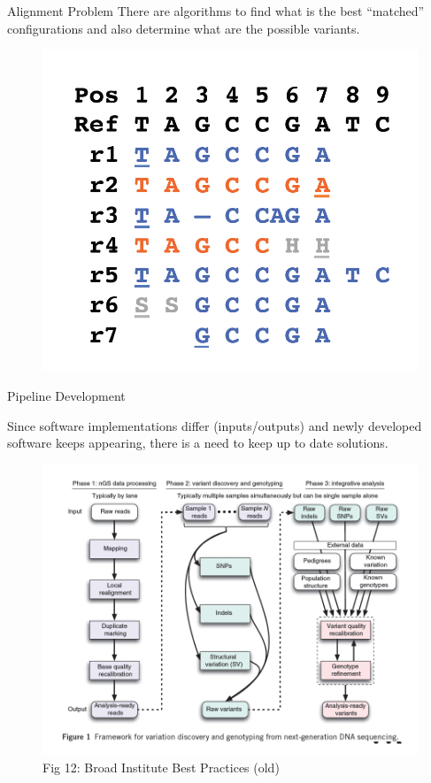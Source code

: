 \documentclass{beamer}
\begin{document}
	
	\begin{frame}{Alignment Problem}
		There are algorithms to find what is the best “matched” configurations and
		also determine what are the possible variants.
		
		\begin{figure}[h]
			\centering
			\includegraphics[scale=0.45]{Figures/alignment_problem.png}
		\end{figure}	
		
	\end{frame}
	
	
	\begin{frame}{Pipeline Development}
		
		Since software implementations differ (inputs/outputs)  and newly developed software keeps appearing, there is a need to keep up to date solutions.
		
		\begin{figure}[h]
			\centering
			\includegraphics[scale=0.45]{Figures/pipeline.png}
			\caption{Fig 12: Broad Institute Best Practices (old)}
		\end{figure}
		
	\end{frame}
	
\end{document}
